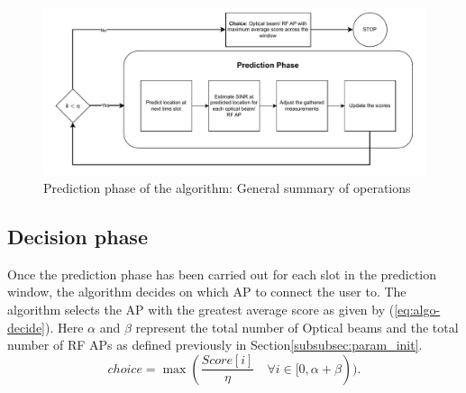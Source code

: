 \begin{figure}
    \centering
    \includegraphics[width=1\linewidth]{Figures/Algorithm-design.drawio.pdf}
    \caption{Prediction phase of the algorithm: General summary of operations}
    \label{fig:algo-prediction}
\end{figure}
\subsection{Decision phase}
Once the prediction phase has been carried out for each slot in the prediction window, the algorithm decides on which AP to connect the user to. The algorithm selects the AP with the greatest average score as given by (\ref{eq:algo-decide}). Here $\alpha$ and $\beta$ represent the total number of Optical beams and the total number of RF APs as defined previously in Section\ref{subsubsec:param_init}. 
\begin{equation}
        {choice} = \max(\frac{Score[i]}{\eta} \quad \forall i \in [0, \alpha + \beta)).
        \label{eq:algo-decide}
    \end{equation}

